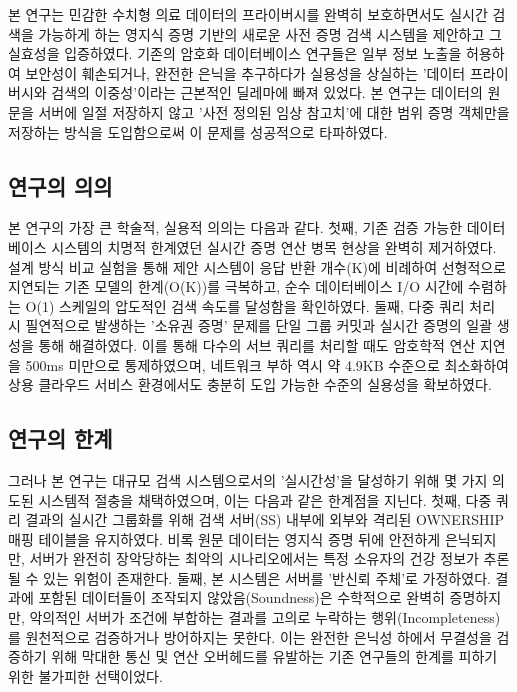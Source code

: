
본 연구는 민감한 수치형 의료 데이터의 프라이버시를 완벽히 보호하면서도 실시간 검색을 가능하게 하는 영지식 증명 기반의 새로운 사전 증명 검색 시스템을 제안하고 그 실효성을 입증하였다. 기존의 암호화 데이터베이스 연구들은 일부 정보 노출을 허용하여 보안성이 훼손되거나, 완전한 은닉을 추구하다가 실용성을 상실하는 '데이터 프라이버시와 검색의 이중성'이라는 근본적인 딜레마에 빠져 있었다. 본 연구는 데이터의 원문을 서버에 일절 저장하지 않고 '사전 정의된 임상 참고치'에 대한 범위 증명 객체만을 저장하는 방식을 도입함으로써 이 문제를 성공적으로 타파하였다.

\subsection{연구의 의의}
본 연구의 가장 큰 학술적, 실용적 의의는 다음과 같다. 첫째, 기존 검증 가능한 데이터베이스 시스템의 치명적 한계였던 실시간 증명 연산 병목 현상을 완벽히 제거하였다. 설계 방식 비교 실험을 통해 제안 시스템이 응답 반환 개수(K)에 비례하여 선형적으로 지연되는 기존 모델의 한계(O(K))를 극복하고, 순수 데이터베이스 I/O 시간에 수렴하는 O(1) 스케일의 압도적인 검색 속도를 달성함을 확인하였다. 둘째, 다중 쿼리 처리 시 필연적으로 발생하는 '소유권 증명' 문제를 단일 그룹 커밋과 실시간 증명의 일괄 생성을 통해 해결하였다. 이를 통해 다수의 서브 쿼리를 처리할 때도 암호학적 연산 지연을 500ms 미만으로 통제하였으며, 네트워크 부하 역시 약 4.9KB 수준으로 최소화하여 상용 클라우드 서비스 환경에서도 충분히 도입 가능한 수준의 실용성을 확보하였다.

\subsection{연구의 한계} 
그러나 본 연구는 대규모 검색 시스템으로서의 '실시간성'을 달성하기 위해 몇 가지 의도된 시스템적 절충을 채택하였으며, 이는 다음과 같은 한계점을 지닌다. 첫째, 다중 쿼리 결과의 실시간 그룹화를 위해 검색 서버(SS) 내부에 외부와 격리된 OWNERSHIP 매핑 테이블을 유지하였다. 비록 원문 데이터는 영지식 증명 뒤에 안전하게 은닉되지만, 서버가 완전히 장악당하는 최악의 시나리오에서는 특정 소유자의 건강 정보가 추론될 수 있는 위험이 존재한다. 둘째, 본 시스템은 서버를 '반신뢰 주체'로 가정하였다. 결과에 포함된 데이터들이 조작되지 않았음(Soundness)은 수학적으로 완벽히 증명하지만, 악의적인 서버가 조건에 부합하는 결과를 고의로 누락하는 행위(Incompleteness)를 원천적으로 검증하거나 방어하지는 못한다. 이는 완전한 은닉성 하에서 무결성을 검증하기 위해 막대한 통신 및 연산 오버헤드를 유발하는 기존 연구들의 한계를 피하기 위한 불가피한 선택이었다.

